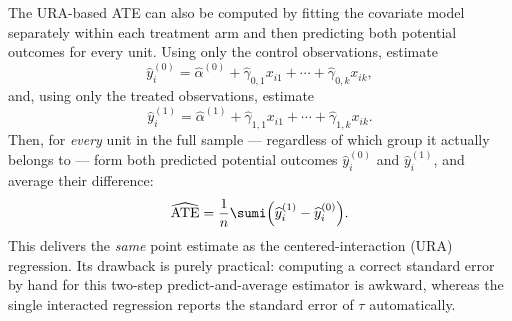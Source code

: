 The URA-based ATE can also be computed by fitting the covariate model separately within each treatment arm and then predicting both potential outcomes for every unit. Using only the control observations, estimate
\[
\widehat y_i^{(0)} = \widehat\alpha^{(0)} + \widehat\gamma_{0,1} x_{i1} + \cdots + \widehat\gamma_{0,k} x_{ik},
\]
and, using only the treated observations, estimate
\[
\widehat y_i^{(1)} = \widehat\alpha^{(1)} + \widehat\gamma_{1,1} x_{i1} + \cdots + \widehat\gamma_{1,k} x_{ik}.
\]
Then, for \emph{every} unit in the full sample --- regardless of which group it actually belongs to --- form both predicted potential outcomes $\widehat y_i^{(0)}$ and $\widehat y_i^{(1)}$, and average their difference:
\[
\widehat{\text{ATE}} = \frac{1}{n}\sumi \Big(\widehat y_i^{(1)} - \widehat y_i^{(0)}\Big).
\]
This delivers the \emph{same} point estimate as the centered-interaction (URA) regression. Its drawback is purely practical: computing a correct standard error by hand for this two-step predict-and-average estimator is awkward, whereas the single interacted regression reports the standard error of $\tau$ automatically.

